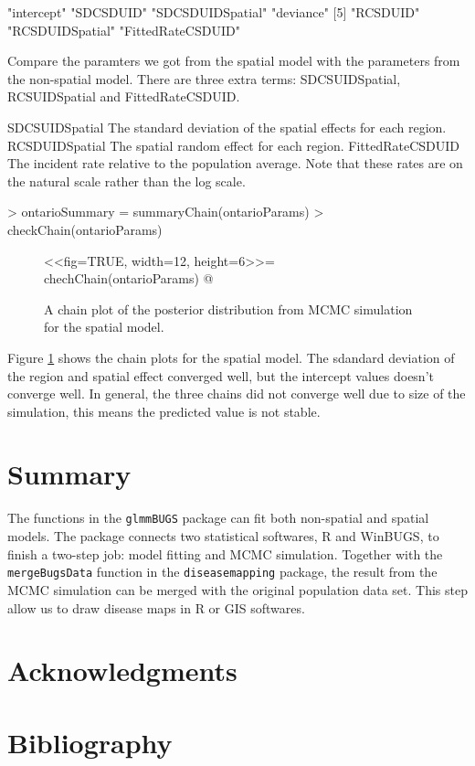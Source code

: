 \documentclass{article}
\begin{document}
\begin{Schunk}
\begin{Soutput}
[1] "intercept"        "SDCSDUID"         "SDCSDUIDSpatial"  "deviance"        
[5] "RCSDUID"          "RCSDUIDSpatial"   "FittedRateCSDUID"
\end{Soutput}
\end{Schunk}

Compare the paramters we got from the spatial model with the parameters from the non-spatial model. 
There are three extra terms: SDCSUIDSpatial, RCSUIDSpatial and FittedRateCSDUID.

SDCSUIDSpatial     The standard deviation of the spatial effects for each region.
RCSDUIDSpatial     The spatial random effect for each region. 
FittedRateCSDUID   The incident rate relative to the population average. Note that these rates are on the natural scale rather than the log scale. 


\begin{Schunk}
\begin{Sinput}
> ontarioSummary = summaryChain(ontarioParams)
> checkChain(ontarioParams)
\end{Sinput}
\end{Schunk}

\begin{figure}[ht]
 \centering
 <<fig=TRUE, width=12, height=6>>=
 chechChain(ontarioParams)
 @
 \caption{A chain plot of the posterior distribution from MCMC simulation for the spatial model.}\label{chainspatial}
\end{figure}

Figure \ref{chainspatial} shows the chain plots for the spatial model. The sdandard deviation of the region and spatial effect converged well, but the intercept values doesn't converge well. In general, the three chains did not converge well due to size of the simulation, this means the predicted value is not stable.

\section{Summary}
The functions in the \verb!glmmBUGS! package can fit both non-spatial and spatial models. 
The package connects two statistical softwares, R and WinBUGS, to finish a two-step job: model fitting and MCMC simulation. 
Together with the \verb!mergeBugsData! function in the \verb!diseasemapping! package, the result from the MCMC simulation can be merged with the original population data set. This step allow us to draw disease maps in R or GIS softwares. 

\section{Acknowledgments}


\section{Bibliography}
\end{document}
